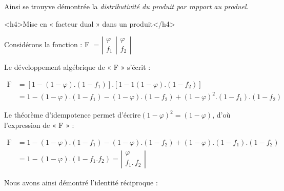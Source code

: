 Ainsi se trouyve démontrée la \emph{distributivité du produit par
rapport au produel}.

<h4>Mise en «  facteur dual »  dans un produit</h4>

Considérons la fonction : F $=\left|\begin{array}{l}
\varphi\\
f_{1}
\end{array}\right|\left.\begin{array}{l}
\varphi\\
f_{2}
\end{array}\right|$\m

Le développement algébrique de «  F  »{} s'écrit :\m

$\begin{array}{rl}
\textrm{F} & =\left[1-\left(1-\varphi\right).\left(1-f_{1}\right)\right].\left[1-1\left(1-\varphi\right).\left(1-f_{2}\right)\right]\\
 & =1-\left(1-\varphi\right).\left(1-f_{1}\right)-\left(1-\varphi\right).\left(1-f_{2}\right)+\left(1-\varphi\right)^{2}.\left(1-f_{1}\right).\left(1-f_{2}\right)
\end{array}$\m

Le théorème d'idempotence permet d'écrire$\left(1-\varphi\right)^{2}=\left(1-\varphi\right)$,
d'où l'expression de «  F  »{} :\m

$\begin{array}{rl}
\textrm{F} & =1-\left(1-\varphi\right).\left(1-f_{1}\right)-\left(1-\varphi\right).\left(1-f_{2}\right)+\left(1-\varphi\right).\left(1-f_{1}\right).\left(1-f_{2}\right)\\
 & =1-\left(1-\varphi\right).\left(1-f_{1}.f_{2}\right)=\left|\begin{array}{c}
\varphi\\
f_{1}.\,f_{2}
\end{array}\right|
\end{array}$

Nous avons ainsi démontré l'identité réciproque :\m

\begin{center}
\end{center}


